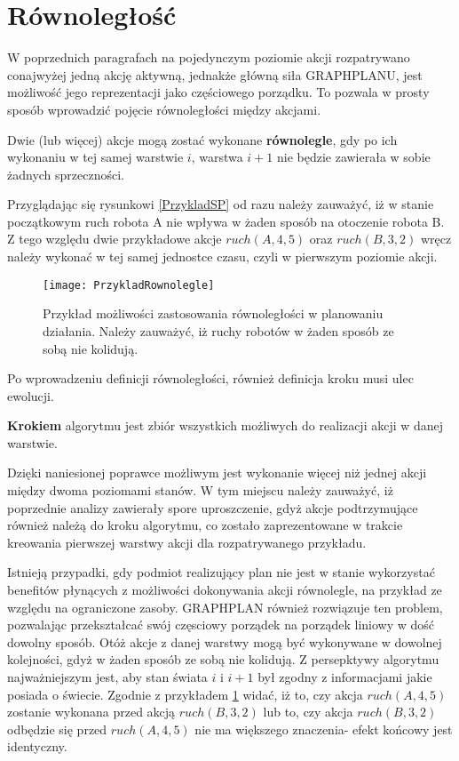     \section{Równoległość}
    \label{Rownoleglosc}
    W poprzednich paragrafach na pojedynczym poziomie akcji rozpatrywano conajwyżej jedną akcję aktywną, jednakże główną siła GRAPHPLANU, jest 
    możliwość jego reprezentacji jako częściowego porządku. To pozwala w prosty sposób wprowadzić pojęcie równoległości między akcjami. 
    \begin{definition}
        \label{Warstwa}
        Dwie (lub więcej) akcje  mogą zostać wykonane \textbf{równolegle}, gdy po ich wykonaniu w tej samej warstwie $i$, warstwa $i+1$ nie będzie 
        zawierała w sobie żadnych sprzeczności.
    \end{definition}
    Przyglądając się rysunkowi \ref{PrzykladSP} od razu należy zauważyć, iż w stanie początkowym ruch robota A nie wpływa w żaden sposób na otoczenie
    robota B. Z tego względu dwie przykładowe akcje $ruch(A,4,5)$ oraz $ruch(B,3,2)$ wręcz należy wykonać w tej samej jednostce czasu, czyli w pierwszym
    poziomie akcji. 
    \begin{figure}[H]
        \texttt{[image: PrzykladRownolegle]}
        \centering
        \caption{Przykład możliwości zastosowania równoległości w planowaniu działania. Należy zauważyć, iż ruchy robotów w żaden sposób ze sobą
        nie kolidują.}
        \label{PrzykladRownolegle}
    \end{figure}
    
    Po wprowadzeniu definicji równoległości, również definicja kroku musi ulec ewolucji. 
    \begin{definition}
        \label{Krok}
        \textbf{Krokiem} algorytmu jest zbiór wszystkich możliwych do realizacji akcji w danej warstwie.
    \end{definition}
    Dzięki naniesionej poprawce możliwym jest wykonanie więcej niż jednej akcji między dwoma poziomami stanów. W tym miejscu należy 
    zauważyć, iż poprzednie analizy zawierały spore uproszczenie, gdyż akcje podtrzymujące również należą do kroku algorytmu, co zostało zaprezentowane
    w trakcie kreowania pierwszej warstwy akcji dla rozpatrywanego przykładu. 

    Istnieją przypadki, gdy podmiot realizujący plan nie jest w stanie wykorzystać benefitów płynących z możliwości dokonywania akcji równolegle, 
    na przykład ze względu na ograniczone zasoby. GRAPHPLAN również rozwiązuje ten problem, pozwalając przekształcać swój częsciowy porządek 
    na porządek liniowy w dość dowolny sposób. Otóż akcje z danej warstwy mogą być wykonywane w dowolnej kolejności, gdyż w żaden sposób ze sobą nie 
    kolidują. Z persepktywy algorytmu najważniejszym jest, aby stan świata $i$ i $i+1$ był zgodny z informacjami jakie posiada o świecie. Zgodnie z
    przykładem \ref{PrzykladRownolegle} widać, iż to, czy akcja $ruch(A,4,5)$ zostanie wykonana przed akcją $ruch(B,3,2)$ lub to, czy akcja 
    $ruch(B,3,2)$ odbędzie się przed $ruch(A,4,5)$ nie ma większego znaczenia- efekt końcowy jest identyczny.

